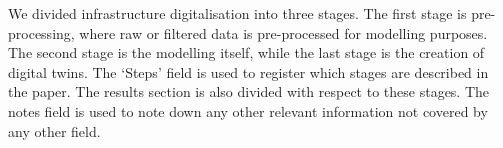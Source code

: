 We divided infrastructure digitalisation into three stages. The first stage is pre-processing, where raw or filtered data is pre-processed for modelling purposes. The second stage is the modelling itself, while the last stage is the creation of digital twins. The `Steps' field is used to register which stages are described in the paper. The results section is also divided with respect to these stages.
The notes field is used to note down any other relevant information not covered by any other field. 